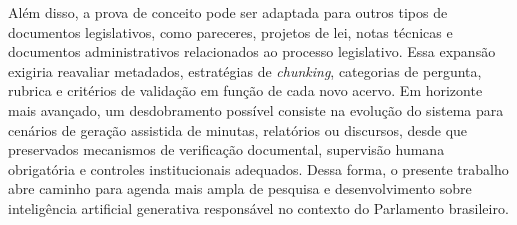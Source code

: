 Além disso, a prova de conceito pode ser adaptada para outros tipos de documentos legislativos, como pareceres, projetos de lei, notas técnicas e documentos administrativos relacionados ao processo legislativo. Essa expansão exigiria reavaliar metadados, estratégias de \textit{chunking}, categorias de pergunta, rubrica e critérios de validação em função de cada novo acervo. Em horizonte mais avançado, um desdobramento possível consiste na evolução do sistema para cenários de geração assistida de minutas, relatórios ou discursos, desde que preservados mecanismos de verificação documental, supervisão humana obrigatória e controles institucionais adequados. Dessa forma, o presente trabalho abre caminho para agenda mais ampla de pesquisa e desenvolvimento sobre inteligência artificial generativa responsável no contexto do Parlamento brasileiro.
